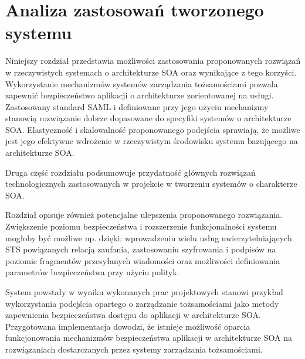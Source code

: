 \chapter{Analiza zastosowań tworzonego systemu}
\label{cha:zastosowania}

{\it

Niniejszy rozdział przedstawia możliwości zastosowania proponowanych rozwiązań w rzeczywistych systemach o architekturze SOA oraz wynikające z tego korzyści. Wykorzystanie mechanizmów systemów zarządzania tożsamościami pozwala zapewnić bezpieczeństwo aplikacji o architekturze zorientowanej na usługi. Zastosowany standard SAML i definiowane przy jego użyciu mechanizmy stanowią rozwiązanie dobrze dopasowane do specyfiki systemów o architekturze SOA. Elastyczność i skalowalność proponowanego podejścia sprawiają, że możliwe jest jego efektywne wdrożenie w rzeczywistym środowisku systemu bazującego na architekturze SOA.

Druga część rozdziału podsumowuje przydatność głównych rozwiązań technologicznych zastosowanych w projekcie w tworzeniu systemów o charakterze SOA.

Rozdział opisuje również potencjalne ulepszenia proponowanego rozwiązania. Zwiększenie poziomu bezpieczeństwa i rozszerzenie funkcjonalności systemu mogłoby być możliwe np. dzięki: wprowadzeniu wielu usług uwierzytelniających STS powiązanych relacją zaufania, zastosowaniu szyfrowania i podpisów na poziomie fragmentów przesyłanych wiadomości oraz możliwości definiowania parametrów bezpieczeństwa przy użyciu polityk.

}


\label{sec:wykorzystanieWPraktyce}

	System powstały w wyniku wykonanych prac projektowych stanowi przykład wykorzystania podejścia opartego o zarządzanie tożsamościami jako metody zapewnienia bezpieczeństwa dostępu do aplikacji w architekturze SOA. Przygotowana implementacja dowodzi, że  istnieje możliwość oparcia funkcjonowania mechanizmów bezpieczeństwa aplikacji w architekturze SOA na rozwiązaniach dostarczanych przez systemy zarządzania tożsamościami. 

